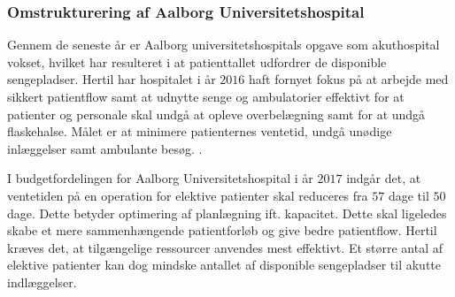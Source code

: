 \subsubsection{Omstrukturering af Aalborg Universitetshospital} 
\noindent
Gennem de seneste år er Aalborg universitetshospitals opgave som akuthospital vokset, hvilket har resulteret i at patienttallet udfordrer de disponible sengepladser. Hertil har hospitalet i år $2016$ haft fornyet fokus på at arbejde med sikkert patientflow samt at udnytte senge og ambulatorier effektivt for at patienter og personale skal undgå at opleve overbelægning samt for at undgå flaskehalse. Målet er at minimere patienternes ventetid, undgå unødige inlæggelser samt ambulante besøg. \cite{Handleplan2016}. 

\noindent
I budgetfordelingen for Aalborg Universitetshospital i år $2017$ indgår det, at ventetiden på en operation for elektive patienter skal reduceres fra $57$ dage til $50$ dage.\cite{Budget2016} Dette betyder optimering af planlægning ift. kapacitet. Dette skal ligeledes skabe et mere sammenhængende patientforløb og give bedre patientflow. Hertil kræves det, at tilgængelige ressourcer anvendes mest effektivt.\cite{Handleplan2015} Et større antal af elektive patienter kan dog mindske antallet af disponible sengepladser til akutte indlæggelser.

